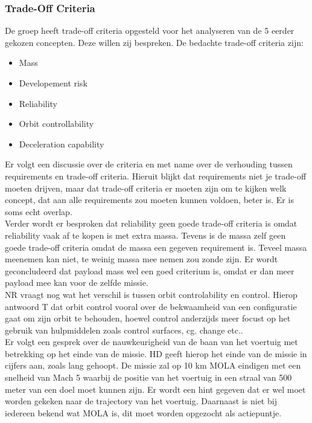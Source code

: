 \subsubsection{Trade-Off Criteria}
De groep heeft trade-off criteria opgesteld voor het analyseren van de 5 eerder gekozen concepten. Deze willen zij bespreken. De bedachte trade-off criteria zijn:

\begin{itemize}
\item Mass
\item Developement risk
\item Reliability
\item Orbit controllability
\item Deceleration capability
\end{itemize}

Er volgt een discussie over de criteria en met name over de verhouding tussen requirements en trade-off criteria. Hieruit blijkt dat requirements niet je trade-off moeten drijven, maar dat trade-off criteria er moeten zijn om te kijken welk concept, dat aan alle requirements zou moeten kunnen voldoen, beter is. Er is soms echt overlap.\\

Verder wordt er besproken dat reliability geen goede trade-off criteria is omdat reliability vaak af te kopen is met extra massa. Tevens is de massa zelf geen goede trade-off criteria omdat de massa een gegeven requirement is. Teveel massa meenemen kan niet, te weinig massa mee nemen zou zonde zijn. Er wordt geconcludeerd dat payload mass wel een goed criterium is, omdat er dan meer payload mee kan voor de zelfde missie.\\

NR vraagt nog wat het verschil is tussen orbit controlability en control. Hierop antwoord T dat orbit control vooral over de bekwaamheid van een configuratie gaat om zijn orbit te behouden, hoewel control anderzijds meer focust op het gebruik van hulpmiddelen zoals control surfaces, cg. change etc..\\

Er volgt een gesprek over de nauwkeurigheid van de baan van het voertuig met betrekking op het einde van de missie. HD geeft hierop het einde van de missie in cijfers aan, zoals lang gehoopt. De missie zal op 10 km MOLA eindigen met een snelheid van Mach 5 waarbij de positie van het voertuig in een straal van 500 meter van een doel moet kunnen zijn. Er wordt een hint gegeven dat er wel moet worden gekeken naar de trajectory van het voertuig. Daarnaast is niet bij iedereen bekend wat MOLA is, dit moet worden opgezocht als actiepuntje.\\

